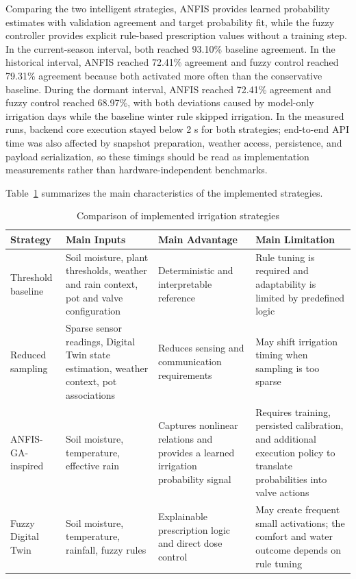 \par Comparing the two intelligent strategies, ANFIS provides learned probability
    estimates with validation agreement and target probability fit, while the fuzzy
    controller provides explicit rule-based prescription values without a training step.
    In the current-season interval, both reached 93.10\% baseline agreement. In the
    historical interval, ANFIS reached 72.41\% agreement and fuzzy control reached
    79.31\% agreement because both activated more often than the conservative baseline.
    During the dormant interval, ANFIS reached 72.41\% agreement and fuzzy control
    reached 68.97\%, with both deviations caused by
    model-only irrigation days while the baseline winter rule skipped irrigation. In the
    measured runs, backend core execution stayed below 2 s for both strategies; end-to-end
    API time was also affected by snapshot preparation, weather access, persistence, and
    payload serialization, so these timings should be read as implementation measurements
    rather than hardware-independent benchmarks.

\par Table~\ref{tab:experiment_comparison} summarizes the main characteristics of the
    implemented strategies.

\begin{table}[h]
\centering
\caption{Comparison of implemented irrigation strategies}
\label{tab:experiment_comparison}
\begin{tabular}{|p{3.2cm}|p{3.2cm}|p{3.2cm}|p{3.2cm}|}
\hline
\textbf{Strategy} & \textbf{Main Inputs} & \textbf{Main Advantage} & \textbf{Main
Limitation} \\
\hline
Threshold baseline & Soil moisture, plant thresholds, weather and rain context, pot and
valve configuration & Deterministic and interpretable reference & Rule tuning is required
and adaptability is limited by predefined logic \\
\hline
Reduced sampling & Sparse sensor readings, Digital Twin state estimation, weather context,
pot associations & Reduces sensing and communication requirements & May shift irrigation
timing when sampling is too sparse \\
\hline
ANFIS-GA-inspired & Soil moisture, temperature, effective rain & Captures nonlinear
relations and provides a learned irrigation probability signal & Requires training,
persisted calibration, and additional execution policy to translate probabilities into
valve actions \\
\hline
Fuzzy Digital Twin & Soil moisture, temperature, rainfall, fuzzy rules & Explainable
prescription logic and direct dose control & May create frequent small activations; the
comfort and water outcome depends on rule tuning \\
\hline
\end{tabular}
\end{table}

